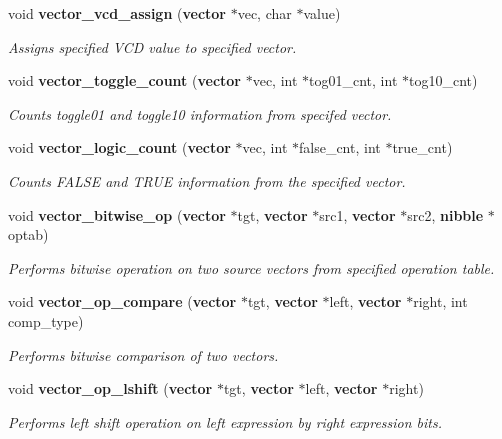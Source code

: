 \begin{CompactItemize}
void {\bf vector\_\-vcd\_\-assign} ({\bf vector} $\ast$vec, char $\ast$value)
\begin{CompactList}\small\item\em Assigns specified VCD value to specified vector.\item\end{CompactList}\item 
void {\bf vector\_\-toggle\_\-count} ({\bf vector} $\ast$vec, int $\ast$tog01\_\-cnt, int $\ast$tog10\_\-cnt)
\begin{CompactList}\small\item\em Counts toggle01 and toggle10 information from specifed vector.\item\end{CompactList}\item 
void {\bf vector\_\-logic\_\-count} ({\bf vector} $\ast$vec, int $\ast$false\_\-cnt, int $\ast$true\_\-cnt)
\begin{CompactList}\small\item\em Counts FALSE and TRUE information from the specified vector.\item\end{CompactList}\item 
void {\bf vector\_\-bitwise\_\-op} ({\bf vector} $\ast$tgt, {\bf vector} $\ast$src1, {\bf vector} $\ast$src2, {\bf nibble} $\ast$optab)
\begin{CompactList}\small\item\em Performs bitwise operation on two source vectors from specified operation table.\item\end{CompactList}\item 
void {\bf vector\_\-op\_\-compare} ({\bf vector} $\ast$tgt, {\bf vector} $\ast$left, {\bf vector} $\ast$right, int comp\_\-type)
\begin{CompactList}\small\item\em Performs bitwise comparison of two vectors.\item\end{CompactList}\item 
void {\bf vector\_\-op\_\-lshift} ({\bf vector} $\ast$tgt, {\bf vector} $\ast$left, {\bf vector} $\ast$right)
\begin{CompactList}\small\item\em Performs left shift operation on left expression by right expression bits.\item\end{CompactList}\item 

\end{CompactItemize}
